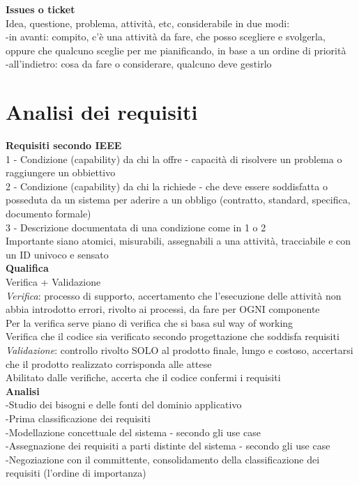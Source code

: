 \documentclass{article}
\begin{document}
		\textbf{Issues o ticket}\\
		Idea, questione, problema, attività, etc, considerabile in due modi:\\
		-in avanti: compito, c'è una attività da fare, che posso scegliere e svolgerla, oppure che qualcuno sceglie per me pianificando, in base a un ordine di priorità\\
		-all'indietro: cosa da fare o considerare, qualcuno deve gestirlo\\
		
	\clearpage
	\section{Analisi dei requisiti}
		\textbf{Requisiti secondo IEEE}\\
		1 - Condizione (capability) da chi la offre - capacità di risolvere un problema o raggiungere un obbiettivo\\
		2 - Condizione (capability) da chi la richiede - che deve essere soddisfatta o posseduta da un sistema per aderire a un obbligo (contratto, standard, specifica, documento formale)\\
		3 - Descrizione documentata di una condizione come in 1 o 2\\
		Importante siano atomici, misurabili, assegnabili a una attività, tracciabile e con un ID univoco e sensato\\
		
		\textbf{Qualifica}\\
		Verifica + Validazione\\
		\textit{Verifica}: processo di supporto, accertamento che l'esecuzione delle attività non abbia introdotto errori, rivolto ai processi, da fare per OGNI componente\\
		Per la verifica serve piano di verifica che si basa sul way of working\\
		Verifica che il codice sia verificato secondo progettazione che soddisfa requisiti\\
		\textit{Validazione}: controllo rivolto SOLO al prodotto finale, lungo e costoso, accertarsi che il prodotto realizzato corrisponda alle attese\\
		Abilitato dalle verifiche, accerta che il codice confermi i requisiti\\
		
		\textbf{Analisi}\\
		-Studio dei bisogni e delle fonti del dominio applicativo\\
		-Prima classificazione dei requisiti\\
		-Modellazione concettuale del sistema - secondo gli use case\\
		-Assegnazione dei requisiti a parti distinte del sistema - secondo gli use case\\
		-Negoziazione con il committente, consolidamento della classificazione dei requisiti (l'ordine di importanza)\\
		
\end{document}
